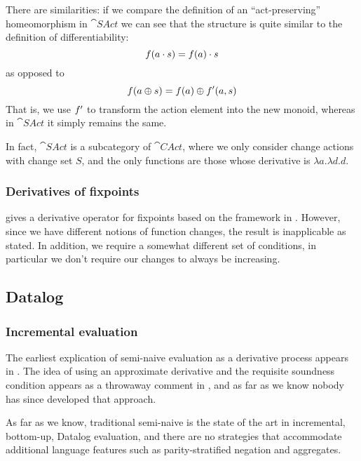 There are similarities: if we compare the definition of an ``act-preserving''
homeomorphism in $\cat{SAct} $\autocite[See][]{kilp2000monoids} we can see that the structure is
quite similar to the definition of differentiability:
\begin{displaymath}
  f(a \cdot s) = f(a) \cdot s
\end{displaymath}
as opposed to
\begin{displaymath}
  f(a \oplus s) = f(a) \oplus f'(a, s)
\end{displaymath}
That is, we use $f'$ to transform the action element into the new
monoid, whereas in $\cat{SAct}$ it simply remains the same.

In fact, $\cat{SAct}$ is a subcategory of $\cat{CAct}$, where we only
consider change actions with change set $S$, and the only functions are those
whose derivative is $\lambda a. \lambda d. d$.

\subsubsection{Derivatives of fixpoints}

\textcite{arntz2017fixpoints} gives a derivative operator for fixpoints based on
the framework in \textcite{cai2014changes}. However, since we have different
notions of function changes, the result is inapplicable as
stated. In addition, we require a somewhat different set of conditions, in particular we
don't require our changes to always be increasing.

\subsection{Datalog}

\subsubsection{Incremental evaluation}

The earliest explication of semi-naive evaluation as a derivative process
appears in \textcite{bancilhon1986naive}. The idea of using an approximate derivative
and the requisite soundness condition appears as a throwaway comment in
\textcite[][section 3.2.2]{bancilhon1986amateur}, and as far as we know nobody has since
developed that approach.

As far as we know, traditional semi-naive is the state of
the art in incremental, bottom-up, Datalog evaluation, and there are no strategies that
accommodate additional language features such as parity-stratified negation and aggregates.

